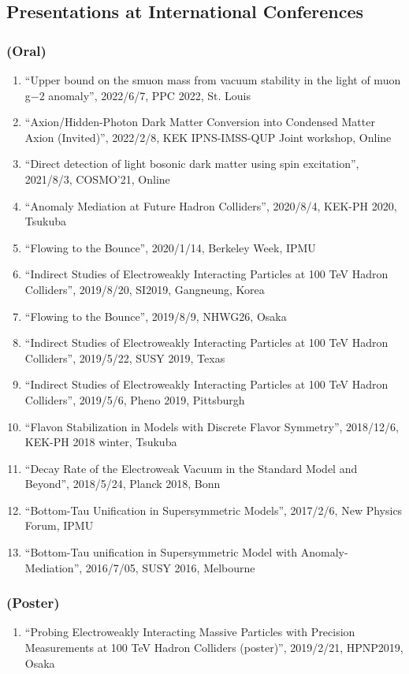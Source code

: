 \documentclass[12pt]{article}
\begin{document}
\subsection*{Presentations at International Conferences}
\subsubsection*{(Oral)}
\begin{enumerate}
 \item ``Upper bound on the smuon mass from vacuum stability in the light of muon g−2 anomaly'', 2022/6/7, PPC 2022, St. Louis
 \item ``Axion/Hidden-Photon Dark Matter Conversion into Condensed Matter Axion (Invited)'', 2022/2/8, KEK IPNS-IMSS-QUP Joint workshop, Online
 \item ``Direct detection of light bosonic dark matter using spin excitation'', 2021/8/3, COSMO'21, Online
 \item ``Anomaly Mediation at Future Hadron Colliders'', 2020/8/4, KEK-PH 2020, Tsukuba
 \item ``Flowing to the Bounce'', 2020/1/14, Berkeley Week, IPMU
 \item ``Indirect Studies of Electroweakly Interacting Particles at 100 TeV Hadron Colliders'', 2019/8/20, SI2019, Gangneung, Korea
 \item ``Flowing to the Bounce'', 2019/8/9, NHWG26, Osaka
 \item ``Indirect Studies of Electroweakly Interacting Particles at 100 TeV Hadron Colliders'', 2019/5/22, SUSY 2019, Texas
 \item ``Indirect Studies of Electroweakly Interacting Particles at 100 TeV Hadron Colliders'', 2019/5/6, Pheno 2019, Pittsburgh
 \item ``Flavon Stabilization in Models with Discrete Flavor Symmetry'', 2018/12/6, KEK-PH 2018 winter, Tsukuba
 \item ``Decay Rate of the Electroweak Vacuum in the Standard Model and Beyond'', 2018/5/24, Planck 2018, Bonn
 \item ``Bottom-Tau Unification in Supersymmetric Models'', 2017/2/6, New Physics Forum, IPMU
 \item ``Bottom-Tau unification in Supersymmetric Model with Anomaly-Mediation'', 2016/7/05, SUSY 2016, Melbourne
\end{enumerate}
\subsubsection*{(Poster)}
\begin{enumerate}
 \item ``Probing Electroweakly Interacting Massive Particles with Precision Measurements at 100 TeV Hadron Colliders (poster)'', 2019/2/21, HPNP2019, Osaka
\end{enumerate}
\end{document}
